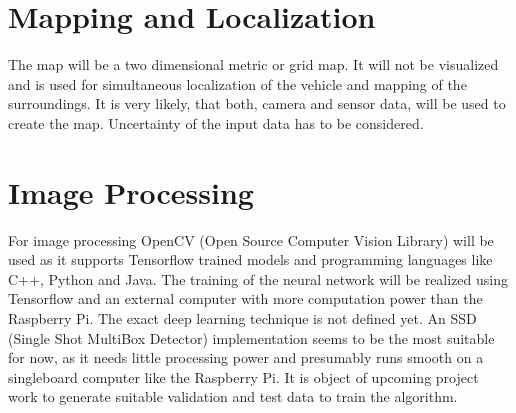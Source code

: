 \documentclass[a4paper,12pt,oneside]{article}
\begin{document}
\section*{Mapping and Localization}

The map will be a two dimensional metric or grid map. It will not be visualized and is used for simultaneous localization of the vehicle and mapping of the surroundings. It is very likely, that both, camera and sensor data, will be used to create the map. Uncertainty of the input data has to be considered.

\section*{Image Processing}

For image processing OpenCV (Open Source Computer Vision Library) will be used as it supports Tensorflow trained models and programming languages like C++, Python and Java. The training of the neural network will be realized using Tensorflow and an external computer with more computation power than the Raspberry Pi. The exact deep learning technique is not defined yet. An SSD (Single Shot MultiBox Detector) implementation seems to be the most suitable for now, as it needs little processing power and presumably runs smooth on a singleboard computer like the Raspberry Pi. It is object of upcoming project work to generate suitable validation and test data to train the algorithm.
\end{document}
